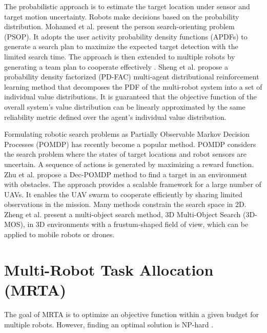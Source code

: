 The probabilistic approach is to estimate the target location under sensor and target motion uncertainty.
Robots make decisions based on the probability distribution.
Mohamed et al. \cite{Mohamed2020person} present the person search-orienting problem (PSOP).
It adopts the user activity probability density functions (APDFs) to generate a search plan to maximize the expected target detection with the limited search time. The approach is then extended to multiple robots by generating a team plan to cooperate effectively \cite{Mohamed2022multirobot}.
Sheng et al. \cite{sheng2022pd} propose a probability density factorized (PD-FAC) multi-agent distributional reinforcement learning method that decomposes the PDF of the multi-robot system into a set of individual value distributions. It is guaranteed that the objective function of the overall system’s value distribution can be linearly approximated by the same reliability metric defined over the agent’s individual value distribution.

Formulating robotic search problems as Partially Observable Markov Decision Processes (POMDP) has recently become a popular method.
POMDP considers the search problem where the states of target locations and robot sensors are uncertain.
A sequence of actions is generated by maximizing a reward function.
Zhu et al. \cite{zhu2020approach} propose a Dec-POMDP method to find a target in an environment with obstacles. The approach provides a scalable framework for a large number of UAVs. It enables the UAV swarm to cooperate efficiently by sharing limited observations in the mission.
Many methods constrain the search space in 2D. Zheng et al. \cite{Zheng2021mos3d} present a multi-object search method, 3D Multi-Object Search (3D-MOS), in 3D environments with a frustum-shaped field of view, which can be applied to mobile robots or drones.


\section{Multi-Robot Task Allocation (MRTA)}
The goal of MRTA is to optimize an objective function within a given budget for multiple robots. However, finding an optimal solution is NP-hard \cite{korsah2013comprehensive}.

